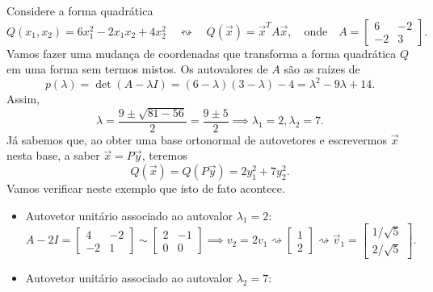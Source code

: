 \begin{ex}
	Considere a forma quadrática
	\begin{equation}
	Q(x_1, x_2) = 6x_1^2 - 2 x_1x_2 + 4 x_2^2 \quad \leftrightsquigarrow \quad Q(\vec{x}) = \vec{x}^T A \vec{x}, \quad \text{onde} \quad
	A =
	\begin{bmatrix}
	6 & -2 \\
	-2 &  3
	\end{bmatrix}.
	\end{equation} Vamos fazer uma mudança de coordenadas que transforma a forma quadrática $Q$ em uma forma sem termos mistos. Os autovalores de $A$ são as raízes de
	\begin{equation}
	p(\lambda) = \det (A- \lambda I) = (6 - \lambda)(3 - \lambda) - 4 = \lambda^2 - 9 \lambda + 14.
	\end{equation} Assim,
	\begin{equation}
	\lambda = \frac{9 \pm \sqrt{81 - 56}}{2} = \frac{9 \pm 5}{2} \implies \lambda_1 = 2, \lambda_2 = 7.
	\end{equation} Já sabemos que, ao obter uma base ortonormal de autovetores e escrevermos $\vec{x}$ nesta base, a saber $\vec{x} = P\vec{y}$, teremos
	\begin{equation}
	Q(\vec{x}) = Q (P\vec{y}) = 2 y_1^2 + 7 y_2^2.
	\end{equation} Vamos verificar neste exemplo que isto de fato acontece.
	\begin{itemize}
		\item Autovetor unitário associado ao autovalor $\lambda_1 = 2$:
		\begin{equation}
		A -2I =
		\begin{bmatrix}
		4 & -2 \\
		-2 &  1
		\end{bmatrix} \sim
		\begin{bmatrix}
		2 & -1 \\
		0 &  0
		\end{bmatrix} \implies v_2 = 2v_1 \rightsquigarrow
		\begin{bmatrix}
		1 \\ 2
		\end{bmatrix} \rightsquigarrow
		\vec{v}_1 = \begin{bmatrix}
		1/\sqrt{5} \\ 2/\sqrt{5}
		\end{bmatrix} .
		\end{equation}
		\item Autovetor unitário associado ao autovalor $\lambda_2 = 7$:

\end{itemize}
\end{ex}
